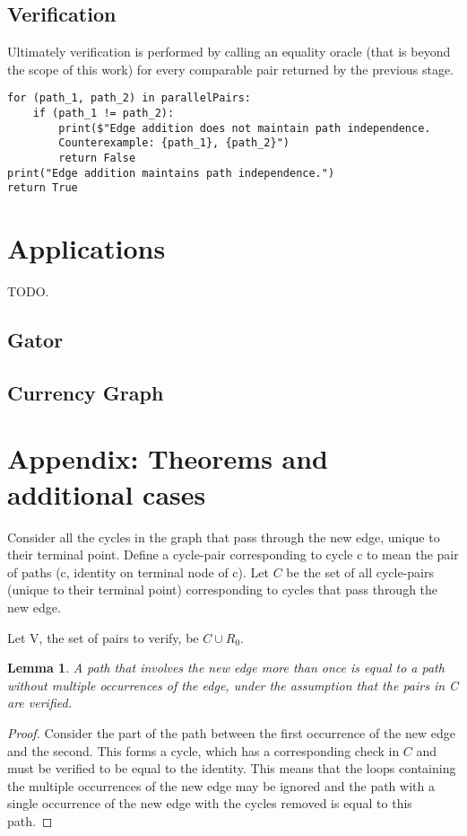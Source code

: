 \documentclass{article}
\newtheorem{lemma}{Lemma}
\begin{document}
\subsection{Verification}
Ultimately verification is performed by calling an equality oracle (that is beyond the scope of this work) for every comparable pair returned by the previous stage.

\begin{verbatim}
for (path_1, path_2) in parallelPairs:
    if (path_1 != path_2):
        print($"Edge addition does not maintain path independence. 
        Counterexample: {path_1}, {path_2}")
        return False
print("Edge addition maintains path independence.")
return True
\end{verbatim}

\section{Applications}
TODO.
\subsection{Gator}
\subsection{Currency Graph}

\section{Appendix: Theorems and additional cases}



Consider all the cycles in the graph that pass through the new edge, unique to their terminal point.
Define a cycle-pair corresponding to cycle c to mean the pair of paths (c, identity on terminal node of c).
Let $C$ be the set of all cycle-pairs (unique to their terminal point) corresponding to cycles that pass through the new edge.

Let V, the set of pairs to verify, be $C \cup R_0$.

\begin{lemma}
\label{cycles_lemma}
A path that involves the new edge more than once is equal to a path without multiple occurrences of the edge, under the assumption that the pairs in C are verified.
\end{lemma}
\begin{proof}
Consider the part of the path between the first occurrence of the new edge and the second. This forms a cycle, which has a corresponding check in $C$ and must be verified to be equal to the identity.
This means that the loops containing the multiple occurrences of the new edge may be ignored and the path with a single occurrence of the new edge with the cycles removed is equal to this path.
\end{proof}
\end{document}

